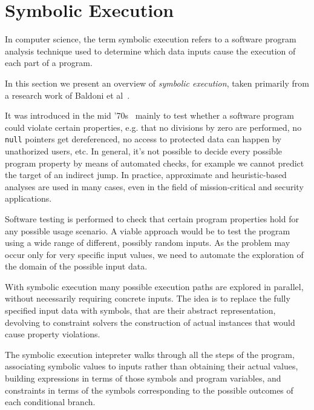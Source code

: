 \section{Symbolic Execution}
In computer science, the term symbolic execution refers to a software program analysis technique used to determine which data inputs cause the execution of each part of a program.

In this section we present an overview of \textit{symbolic execution}, taken primarily from a research work of Baldoni et al~\cite{Baldoni:2018:SSE:3212709.3182657}.

 It was introduced in the mid '70s~\cite{K-ICRS75,SELECT-ICRS75,K-CACM76,H-TSE77} mainly to test whether a software program could violate certain properties, e.g. that no divisions by zero are performed, no \texttt{null} pointers get dereferenced, no access to protected data can happen by unathorized users, etc. In general, it's not possible to decide every possible program property by means of automated checks, for example we cannot predict the target of an indirect jump. %
In practice, approximate and heuristic-based analyses are used in many cases, even in the field of mission-critical and security applications.

Software testing is performed to check that certain program properties hold for any possible usage scenario. A viable approach would be to test the program using a wide range of different, possibly random inputs. As the problem may occur only for very specific input values, we need to automate the exploration of the domain of the possible input data. 

With symbolic execution many possible execution paths are explored in parallel, without necessarily requiring concrete inputs. The idea is to replace the fully specified input data with symbols, that are their abstract representation, devolving to constraint solvers the construction of actual instances that would cause property violations. 

The symbolic execution intepreter walks through all the steps of the program, associating symbolic values to inputs rather than obtaining their actual values, building  expressions in terms of those symbols and program variables, and constraints in terms of the symbols corresponding to the possible outcomes of each conditional branch. 

